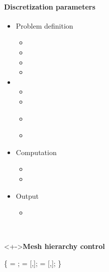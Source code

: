 
\begin{frame}[fragile] 
\secframetitle{\ssParameters}
\framesubtitle{Discretization parameters}
\vspace{-0.2in}
\begin{minipage}[t]{1.7in}
\begin{itemize}
\item Problem definition
  \begin{itemize}
  \item {}
  \item {}
  \item {}
  \item {}
  \end{itemize}
\item {}
  \begin{itemize}
  \item {}
  \item {}
  \item \textcolor{green!50!black}{}
  \item \textcolor{green!50!black}{}
  \end{itemize}
\item Computation
  \begin{itemize}
  \item {}
  \item {}
  \end{itemize}
\item Output
  \begin{itemize}
    \item {}
  \end{itemize}
\end{itemize}
\end{minipage} \
\begin{minipage}[t]{2.6in}
\vspace{-0.2in}
\begin{block}<+->{\textbf{Mesh hierarchy control}}
  \footnotesize \vspace{-0.1in}
\begin{semiverbatim}
 \{ 
      = ;
      = [,];
    = [,\valuetext{4}];
\}
\end{semiverbatim}
\begin{semiverbatim}
\end{semiverbatim}
\end{block}
\end{minipage}
\end{frame}

